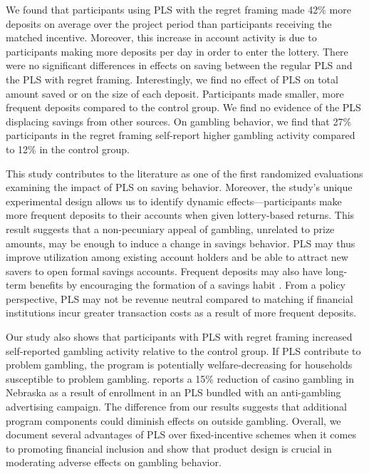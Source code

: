 \documentclass[11pt]{article}
\begin{document}

	We found that participants using PLS with the regret framing made 42\% more deposits on average over the project period than participants receiving the matched incentive. Moreover, this increase in account activity is due to participants making more deposits per day in order to enter the lottery. There were no significant differences in effects on saving between the regular PLS and the PLS with regret framing. Interestingly, we find no effect of PLS on total amount saved or on the size of each deposit. Participants made smaller, more frequent deposits compared to the control group. We find no evidence of the PLS displacing savings from other sources. On gambling behavior, we find that 27\% participants in the regret framing self-report higher gambling activity compared to 12\% in the control group.


	This study contributes to the literature as one of the first randomized evaluations examining the impact of PLS on saving behavior. Moreover, the study's unique experimental design allows us to identify dynamic effects---participants make more frequent deposits to their accounts when given lottery-based returns. This result suggests that a non-pecuniary appeal of gambling, unrelated to prize amounts, may be enough to induce a change in savings behavior. PLS may thus improve utilization among existing account holders and be able to attract new savers to open formal savings accounts. Frequent deposits may also have long-term benefits by encouraging the formation of a savings habit . From a policy perspective, PLS may not be revenue neutral compared to matching if financial institutions incur greater transaction costs as a result of more frequent deposits.


	Our study also shows that participants with PLS with regret framing increased self-reported gambling activity relative to the control group. If PLS contribute to problem gambling, the program is potentially welfare-decreasing for households susceptible to problem gambling.  reports a 15\% reduction of casino gambling in Nebraska as a result of enrollment in an PLS bundled with an anti-gambling advertising campaign. The difference from our results suggests that additional program components could diminish effects on outside gambling. Overall, we document several advantages of PLS over fixed-incentive schemes when it comes to promoting financial inclusion and show that product design is crucial in moderating adverse effects on gambling behavior.
\end{document}
